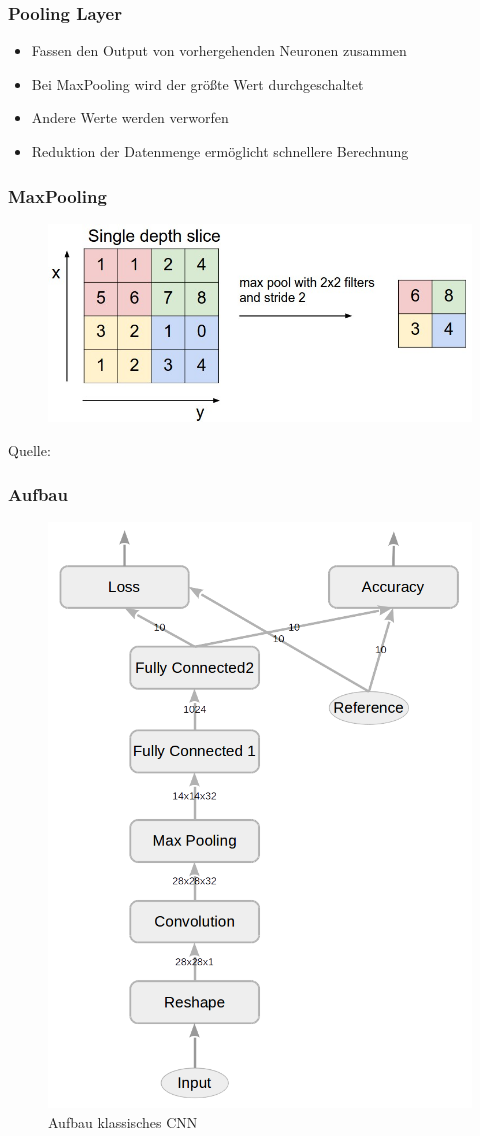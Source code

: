 \documentclass{beamer}
\begin{document}
\begin{frame}
	\frametitle{Pooling Layer}
	\begin{itemize}
		\item Fassen den Output von vorhergehenden Neuronen zusammen
		\item Bei MaxPooling wird der größte Wert durchgeschaltet
		\item Andere Werte werden verworfen
		\item Reduktion der Datenmenge ermöglicht schnellere Berechnung
	\end{itemize}
\end{frame}
\begin{frame}
	\frametitle{MaxPooling}
	\begin{figure}
		\includegraphics[width=0.9\linewidth]{images/maxpool.jpeg}
	\end{figure}
	\hspace*{0pt}\hbox{\scriptsize Quelle:}
\end{frame}


\begin{frame}
	\frametitle{Aufbau}
	\begin{figure}
		\includegraphics[width=0.4\linewidth]{images/main_graph_conv_reduced.png}
		\caption{Aufbau klassisches CNN}
		\label{fig:main_graph_conv}
	\end{figure}
\end{frame}
\end{document}
